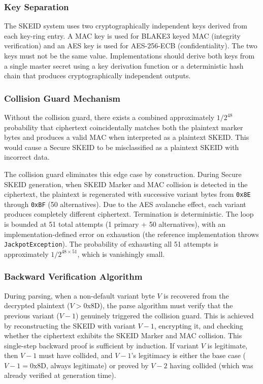 \documentclass[fleqn,10pt,lineno]{wlpeerj}
\begin{document}
\subsubsection{Key Separation}\label{key-separation}

The SKEID system uses two cryptographically independent keys derived
from each key-ring entry. A MAC key is used for BLAKE3 keyed MAC
(integrity verification) and an AES key is used for AES-256-ECB
(confidentiality). The two keys must not be the same value.
Implementations should derive both keys from a single master secret
using a key derivation function or a deterministic hash chain that
produces cryptographically independent outputs.

\subsubsection{Collision Guard
Mechanism}\label{collision-guard-mechanism}

Without the collision guard, there exists a combined approximately
\(1/2^{48}\) probability that ciphertext coincidentally matches both the
plaintext marker bytes and produces a valid MAC when interpreted as a
plaintext SKEID. This would cause a Secure SKEID to be misclassified as
a plaintext SKEID with incorrect data.

The collision guard eliminates this edge case by construction. During
Secure SKEID generation, when SKEID Marker and MAC collision is detected
in the ciphertext, the plaintext is regenerated with successive variant
bytes from \texttt{0x8E} through \texttt{0xBF} (50 alternatives). Due to
the AES avalanche effect, each variant produces completely different
ciphertext. Termination is deterministic. The loop is bounded at 51
total attempts (1 primary + 50 alternatives), with an
implementation-defined error on exhaustion (the reference implementation
throws \texttt{JackpotException}). The probability of exhausting all 51
attempts is approximately \(1/2^{48 \times 51}\), which is vanishingly
small.

\subsubsection{Backward Verification
Algorithm}\label{backward-verification-algorithm}

During parsing, when a non-default variant byte \(V\) is recovered from
the decrypted plaintext (\(V > \text{0x8D}\)), the parse algorithm must
verify that the previous variant (\(V-1\)) genuinely triggered the
collision guard. This is achieved by reconstructing the SKEID with
variant \(V-1\), encrypting it, and checking whether the ciphertext
exhibits the SKEID Marker and MAC collision. This single-step backward
proof is sufficient by induction. If variant \(V\) is legitimate, then
\(V-1\) must have collided, and \(V-1\)'s legitimacy is either the base
case (\(V-1 = \text{0x8D}\), always legitimate) or proved by \(V-2\)
having collided (which was already verified at generation time).
\end{document}
